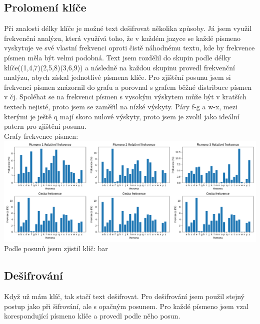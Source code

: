 \documentclass{article}
\begin{document}
    \subsection{Prolomení klíče}
    Při znalosti délky klíče je možné text dešifrovat několika způsoby. Já jsem využil frekvenční analýzu, která využívá toho, že v 
    každém jazyce se každé písmeno vyskytuje ve své vlastní frekvenci oproti čistě náhodnému textu, kde by frekvence písmen měla být 
    velmi podobná. Text jsem rozdělil do skupin podle délky klíče((1,4,7)(2,5,8)(3,6,9)) a následně na každou skupinu provedl frekvenční
    analýzu, abych získal jednotlivé písmena klíče. Pro zjištění posunu jsem si frekvenci písmen znázornil do grafu a porovnal s grafem
    běžné distribuce písmen v čj. Spoléhat se na frekvenci písmen s vysokým výskytem může být v kratších textech nejisté, proto jsem se 
    zaměřil na nízké výskyty. Páry f-g a w-x, mezi kterými je ještě q mají skoro nulové výskyty, proto jsem je zvolil jako ideální patern
    pro zjištění posunu.\\
    Grafy frekvence písmen:
    \includegraphics[width = 1.3\linewidth]{FrekvenceGraf.png}\\
    Podle posunů jsem zjistil klíč: bar\\
    \subsection{Dešifrování}
    Když už mám klíč, tak stačí text dešifrovat. Pro dešifrování jsem použil stejný postup jako při šifrování, ale s opačným posunem.
    Pro každé písmeno jsem vzal korespondující písmeno klíče a provedl podle něho posun.\\
\end{document}
